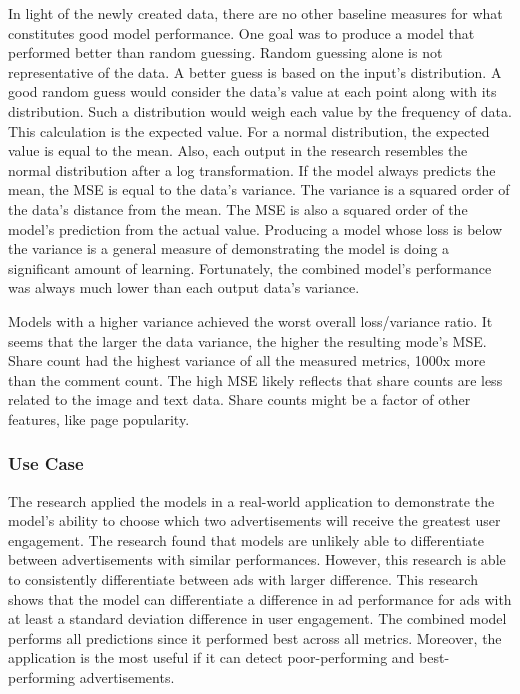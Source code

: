 \documentclass[mksc,blindrev]{informs3} %
\begin{document}
In light of the newly created data, there are no other baseline measures for what constitutes good model performance. One goal was to produce a model that performed better than random guessing. Random guessing alone is not representative of the data. A better guess is based on the input's distribution. A good random guess would consider the data's value at each point along with its distribution. Such a distribution would weigh each value by the frequency of data. This calculation is the expected value. For a normal distribution, the expected value is equal to the mean. Also, each output in the research resembles the normal distribution after a log transformation. If the model always predicts the mean, the MSE is equal to the data's variance. The variance is a squared order of the data's distance from the mean. The MSE is also a squared order of the model's prediction from the actual value. Producing a model whose loss is below the variance is a general measure of demonstrating the model is doing a significant amount of learning. Fortunately, the combined model's performance was always much lower than each output data's variance.

Models with a higher variance achieved the worst overall loss/variance ratio.  It seems that the larger the data variance, the higher the resulting mode's MSE.  Share count had the highest variance of all the measured metrics, 1000x more than the comment count.  The high MSE likely reflects that share counts are less related to the image and text data. Share counts might be a factor of other features, like page popularity.

\subsubsection{Use Case}

The research applied the models in a real-world application to demonstrate the model's ability to choose which two advertisements will receive the greatest user engagement. The research found that models are unlikely able to differentiate between advertisements with similar performances. However, this research is able to consistently differentiate between ads with larger difference. This research shows that the model can differentiate a difference in ad performance for ads with at least a standard deviation difference in user engagement. The combined model performs all predictions since it performed best across all metrics. Moreover, the application is the most useful if it can detect poor-performing and best-performing advertisements.
\end{document}
